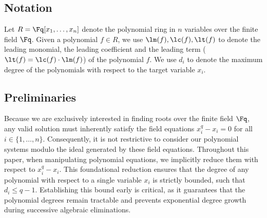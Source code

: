 \subsection{Notation}

Let \(R = \Fq[x_1, \dots, x_n]\) denote the polynomial ring in \(n\) variables over the finite field \(\Fq\). Given a polynomial \(f \in R\), we use \(\lm(f), \lc(f), \lt(f)\) to denote the leading monomial, the leading coefficient and the leading term (\(\lt(f) = \lc(f)\cdot \lm(f)\)) of the polynomial \(f\). We use $d_i$ to denote the maximum degree of the polynomials with respect to the target variable $x_i$. 

\subsection{Preliminaries}
Because we are exclusively interested in finding roots over the finite field $\Fq$, any valid solution must inherently satisfy the field equations $x_i^q - x_i = 0$ for all $i \in \{1, \dots, n\}$. Consequently, it is not restrictive to consider our polynomial systems modulo the ideal generated by these field equations. Throughout this paper, when manipulating polynomial equations, we implicitly reduce them with respect to $x_i^q - x_i$. This foundational reduction ensures that the degree of any polynomial with respect to a single variable $x_i$ is strictly bounded, such that $d_i \le q-1$. Establishing this bound early is critical, as it guarantees that the polynomial degrees remain tractable and prevents exponential degree growth during successive algebraic eliminations.